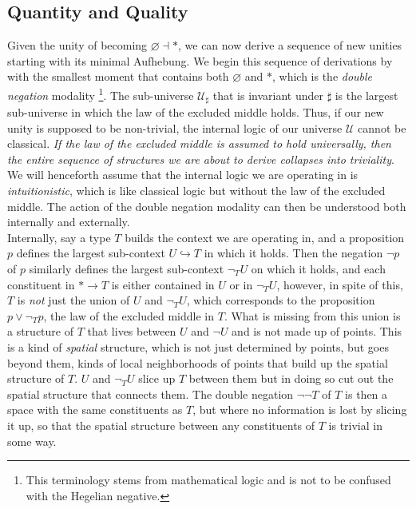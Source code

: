 \documentclass{article}
\begin{document}
\subsection{Quantity and Quality}
Given the unity of becoming $\varnothing\dashv *$, we can now derive a sequence of new unities starting with its minimal Aufhebung. We begin this sequence of derivations by with the smallest moment that contains both $\varnothing$ and $*$, which is the \emph{double negation} modality\cite{Sketches} \footnote{This terminology stems from mathematical logic and is not to be confused with the Hegelian negative.}. The sub-universe $\mathcal{U}_\sharp$ that is invariant under $\sharp$ is the largest sub-universe in which the law of the excluded middle holds. Thus, if our new unity is supposed to be non-trivial, the internal logic of our universe $\mathcal{U}$ cannot be classical. \emph{If the law of the excluded middle is assumed to hold universally, then the entire sequence of structures we are about to derive collapses into triviality}. We will henceforth assume that the internal logic we are operating in is \emph{intuitionistic}, which is like classical logic but without the law of the excluded middle. The action of the double negation modality can then be understood both internally and externally. \\

Internally, say a type $T$ builds the context we are operating in, and a proposition $p$ defines the largest sub-context $U\hookrightarrow T$ in which it holds. Then the negation $\neg p$ of $p$ similarly defines the largest sub-context $\neg_T U$ on which it holds, and each constituent in $*\rightarrow T$ is either contained in $U$ or in $\neg_T U$, however, in spite of this, $T$ is \emph{not} just the union of $U$ and $\neg_T U$, which corresponds to the proposition $p\vee \neg_T p$, the law of the excluded middle in $T$. What is missing from this union is a structure of $T$ that lives between $U$ and $\neg U$ and is not made up of points. This is a kind of \emph{spatial} structure, which is not just determined by points, but goes beyond them, kinds of local neighborhoods of points that build up the spatial structure of $T$. $U$ and $\neg_T U$ slice up $T$ between them but in doing so cut out the spatial structure that connects them. The double negation $\neg\neg T$ of $T$ is then a space with the same constituents as $T$, but where no information is lost by slicing it up, so that the spatial structure between any constituents of $T$ is trivial in some way. \\
\end{document}

